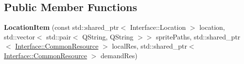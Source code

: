 \subsection*{Public Member Functions}
\begin{DoxyCompactItemize}
\item 
\hypertarget{class_location_item_ad79b09601410e4dd78a3475d8643f8ae}{{\bfseries Location\-Item} (const std\-::shared\-\_\-ptr$<$ Interface\-::\-Location $>$ location, std\-::vector$<$ std\-::pair$<$ Q\-String, Q\-String $>$$>$ sprite\-Paths, std\-::shared\-\_\-ptr$<$ \hyperlink{class_interface_1_1_common_resource}{Interface\-::\-Common\-Resource} $>$ local\-Res, std\-::shared\-\_\-ptr$<$ \hyperlink{class_interface_1_1_common_resource}{Interface\-::\-Common\-Resource} $>$ demand\-Res)}\label{class_location_item_ad79b09601410e4dd78a3475d8643f8ae}


\end{DoxyCompactItemize}
